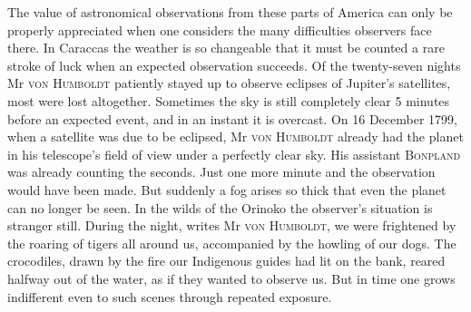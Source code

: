 The value of astronomical observations from these parts of America can only be properly appreciated when one considers the many difficulties observers face there. In Caraccas the weather is so changeable that it must be counted a rare stroke of luck when an expected observation succeeds. Of the twenty-seven nights Mr \textsc{von Humboldt} patiently stayed up to observe eclipses of Jupiter’s satellites, most were lost altogether. Sometimes the sky is still completely clear 5 minutes before an expected event, and in an instant it is overcast. On 16 December 1799, when a satellite was due to be eclipsed, Mr \textsc{von Humboldt} already had the planet in his telescope’s field of view under a perfectly clear sky. His assistant \textsc{Bonpland} was already counting the seconds. Just one more minute and the observation would have been made. But suddenly a fog arises so thick that even the planet can no longer be seen. In the wilds of the Orinoko the observer’s situation is stranger still. During the night, writes Mr \textsc{von Humboldt}, we were frightened by the roaring of tigers all around us, accompanied by the howling of our dogs. The crocodiles, drawn by the fire our Indigenous guides had lit on the bank, reared halfway out of the water, as if they wanted to observe us. But in time one grows indifferent even to such scenes through repeated exposure.

